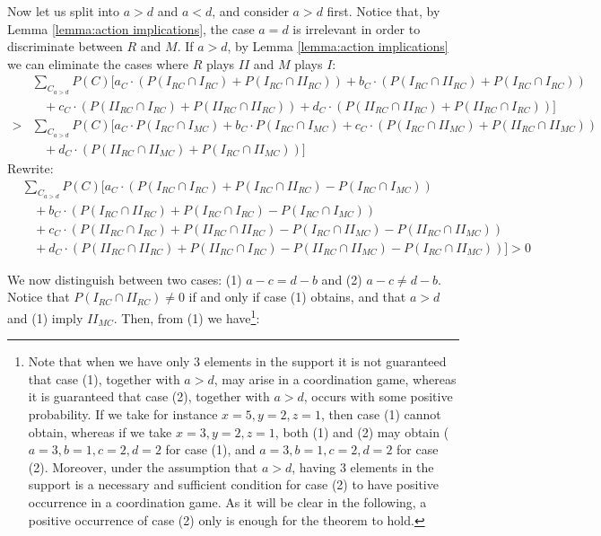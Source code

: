 \documentclass[fleqn,reqno,11pt]{article}
\begin{document}
\noindent Now let us split into $a>d$ and $a<d$, and consider $a>d$ first.  Notice that, by
Lemma \ref{lemma:action implications}, the case $a=d$ is irrelevant in order to discriminate
between $R$ and $M$. If $a>d$, by Lemma \ref{lemma:action implications} we can eliminate the
cases where $R$ plays $II$ and $M$ plays $I$:
\begin{align*}
  & \textstyle{\sum_{C_{a>d}}} P(C)[a_{C} \cdot (P(I_{RC}\cap I_{RC}) + P(I_{RC}\cap II_{RC})) + b_{C} \cdot
  (P(I_{RC}\cap II_{RC}) + P(I_{RC}\cap I_{RC})) \\ 
  & \ \ \ \ + c_{C} \cdot (P(II_{RC}\cap I_{RC})
  +P(II_{RC}\cap II_{RC})) + d_{C} \cdot (P(II_{RC}\cap II_{RC})+P(II_{RC}\cap I_{RC}))] \\
  > & 
  \textstyle{\sum_{C_{a>d}}} P(C)[a_{C} \cdot P(I_{RC}\cap I_{MC}) + b_{C} \cdot P(I_{RC}\cap I_{MC}) +
  c_{C} \cdot (P(I_{RC}\cap II_{MC})+P(II_{RC}\cap II_{MC})) \\ 
  & \ \ \ \ + d_{C} \cdot (P(II_{RC}\cap
  II_{MC})+P(I_{RC}\cap II_{MC}))]
\end{align*}
Rewrite:
\begin{align*}
  & \textstyle{\sum_{C_{a>d}}} P(C)[a_{C} \cdot (P(I_{RC}\cap I_{RC}) + P(I_{RC}\cap II_{RC})-
  P(I_{RC}\cap I_{MC})) \\ 
  & \ \ \ \ + b_{C} \cdot (P(I_{RC}\cap II_{RC}) + P(I_{RC}\cap I_{RC})-
  P(I_{RC}\cap I_{MC})) \\ 
  & \ \ \ \ + c_{C} \cdot (P(II_{RC}\cap I_{RC}) +P(II_{RC}\cap II_{RC})-
  P(I_{RC}\cap II_{MC})- P(II_{RC}\cap II_{MC})) \\ 
  & \ \ \ \ + d_{C} \cdot (P(II_{RC}\cap
  II_{RC})+P(II_{RC}\cap I_{RC})- P(II_{RC}\cap II_{MC})- P(I_{RC}\cap II_{MC}))]> 0
\end{align*}



\noindent We now distinguish between two cases: (1) $ a-c = d-b $ and (2) $  a-c \neq d-b $. Notice that $P(I_{RC}\cap II_{RC}) \neq 0$ if and only if case (1) obtains, and that $a>d$ and (1) imply $II_{MC}$. Then, from (1) we have\footnote{Note that when we have only 3 elements in the support it is not guaranteed that case (1), together with $a>d$, may arise in a coordination game, whereas it is guaranteed that case (2), together with $a>d$, occurs with some positive probability. If we take for instance $x= 5, y= 2, z= 1$, then case (1) cannot obtain, whereas if we take $x= 3, y= 2, z= 1$, both (1) and (2) may obtain ($a=3, b=1, c=2, d=2$ for case (1), and $a=3, b=1, c=2, d=2$ for case (2). Moreover, under the assumption that $a>d$, having 3 elements in the support is a necessary and sufficient condition for case (2) to have positive occurrence in a coordination game. As it will be clear in the following, a positive occurrence of case (2) only is enough for the theorem to hold.}:
\end{document}

